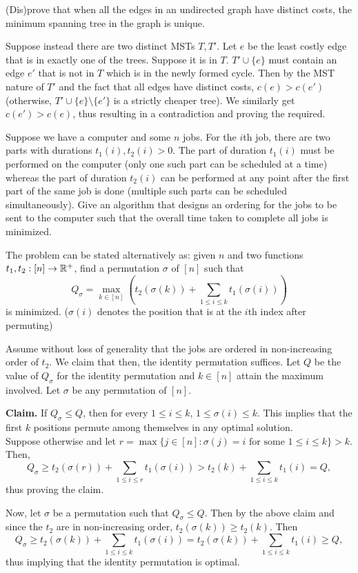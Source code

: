 \begin{exercise}
	(Dis)prove that when all the edges in an undirected graph have distinct costs, the minimum spanning tree in the graph is unique.
\end{exercise}
\begin{solution*}
	Suppose instead there are two distinct MSTs $T, T'$. Let $e$ be the least costly edge that is in exactly one of the trees. Suppose it is in $T$. $T'\cup\{e\}$ must contain an edge $e'$ that is not in $T$ which is in the newly formed cycle. Then by the MST nature of $T'$ and the fact that all edges have distinct costs, $c(e)>c(e')$ (otherwise, $T'\cup\{e\}\setminus\{e'\}$ is a strictly cheaper tree). We similarly get $c(e')>c(e)$, thus resulting in a contradiction and proving the required.
\end{solution*}

\begin{exercise}
	Suppose we have a computer and some $n$ jobs. For the $i$th job, there are two parts with durations $t_{1}(i),t_{2}(i)>0$. The part of duration $t_{1}(i)$ must be performed on the computer (only one such part can be scheduled at a time) whereas the part of duration $t_{2}(i)$ can be performed at any point after the first part of the same job is done (multiple such parts can be scheduled simultaneously). Give an algorithm that designs an ordering for the jobs to be sent to the computer such that the overall time taken to complete all jobs is minimized.
\end{exercise}
\begin{solution*}
	The problem can be stated alternatively as: given $n$ and two functions $t_1,t_2:[n]\to\mathbb{R}^+$, find a permutation $\sigma$ of $[n]$ such that
	\[ Q_\sigma = \max_{k\in[n]} \left(t_2(\sigma(k)) + \sum_{1\leq i\leq k} t_1(\sigma(i))\right) \]
	is minimized. ($\sigma(i)$ denotes the position that is at the $i$th index after permuting)

	Assume without loss of generality that the jobs are ordered in non-increasing order of $t_2$. We claim that then, the identity permutation suffices. Let $Q$ be the value of $Q_\sigma$ for the identity permutation and $k\in[n]$ attain the maximum involved. Let $\sigma$ be any permutation of $[n]$.

	\textbf{Claim.} If $Q_\sigma\leq Q$, then for every $1\leq i\leq k$, $1\leq\sigma(i)\leq k$. This implies that the first $k$ positions permute among themselves in any optimal solution.\\
	Suppose otherwise and let $r=\max\{j\in[n] : \sigma(j)=i\text{ for some }1\leq i\leq k\}> k$. Then,
	\[ Q_\sigma \geq t_2(\sigma(r)) + \sum_{1\leq i\leq r} t_1(\sigma(i)) > t_2(k) + \sum_{1\leq i\leq k}t_1(i) = Q, \]
	thus proving the claim.

	Now, let $\sigma$ be a permutation such that $Q_\sigma \leq Q$. Then by the above claim and since the $t_2$ are in non-increasing order, $t_2(\sigma(k))\geq t_2(k)$. Then
	\[ Q_\sigma \geq t_2(\sigma(k)) + \sum_{1\leq i\leq k} t_1(\sigma(i)) = t_2(\sigma(k)) + \sum_{1\leq i\leq k} t_1(i) \geq Q, \]
	thus implying that the identity permutation is optimal. 
\end{solution*}


